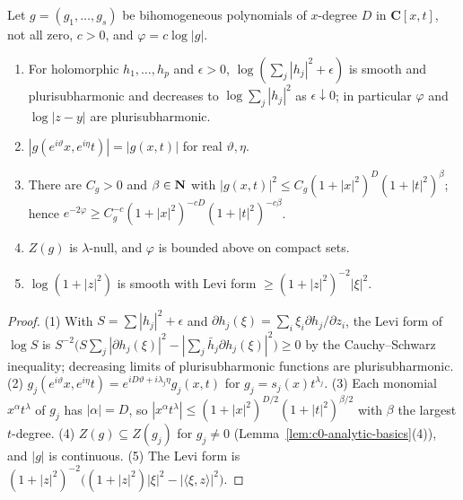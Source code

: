 \begin{lemma}\label{lem:c0-weight}
\leanok
{}
Let $g=(g_1,\dots,g_s)$ be bihomogeneous polynomials of $x$-degree $D$ in $\mathbf C[x,t]$, not all zero, $c>0$, and
$\varphi=c\log|g|$.
\begin{enumerate}
\item For holomorphic $h_1,\dots,h_p$ and $\epsilon>0$, $\log(\sum_j|h_j|^2+\epsilon)$ is smooth and plurisubharmonic and decreases to
$\log\sum_j|h_j|^2$ as $\epsilon\downarrow0$; in particular $\varphi$ and $\log|z-y|$ are plurisubharmonic.
\item $|g(e^{i\vartheta}x,e^{i\eta}t)|=|g(x,t)|$ for real $\vartheta,\eta$.
\item There are $C_g>0$ and $\beta\in\mathbf{N}$ with $|g(x,t)|^2\le C_g(1+|x|^2)^D(1+|t|^2)^\beta$; hence
$e^{-2\varphi}\ge C_g^{-c}(1+|x|^2)^{-cD}(1+|t|^2)^{-c\beta}$.
\item $Z(g)$ is $\lambda$-null, and $\varphi$ is bounded above on compact sets.
\item $\log(1+|z|^2)$ is smooth with Levi form $\ge(1+|z|^2)^{-2}|\xi|^2$.
\end{enumerate}
\end{lemma}

\begin{proof}
(1) With $S=\sum|h_j|^2+\epsilon$ and $\partial h_j(\xi)=\sum_i\xi_i\partial h_j/\partial z_i$, the Levi form of $\log S$ is
$S^{-2}\bigl(S\sum_j|\partial h_j(\xi)|^2-|\sum_j\bar h_j\partial h_j(\xi)|^2\bigr)\ge0$ by the Cauchy--Schwarz inequality; decreasing limits of
plurisubharmonic functions are plurisubharmonic. (2) $g_j(e^{i\vartheta}x,e^{i\eta}t)=e^{iD\vartheta+i\lambda_j\eta}g_j(x,t)$ for $g_j=s_j(x)t^{\lambda_j}$. (3)
Each monomial $x^\alpha t^\lambda$ of $g_j$ has $|\alpha|=D$, so $|x^\alpha t^\lambda|\le(1+|x|^2)^{D/2}(1+|t|^2)^{\beta/2}$ with $\beta$ the largest
$t$-degree. (4) $Z(g)\subseteq Z(g_j)$ for $g_j\ne0$ (Lemma~\ref{lem:c0-analytic-basics}(4)), and $|g|$ is continuous. (5) The Levi form is
$(1+|z|^2)^{-2}\bigl((1+|z|^2)|\xi|^2-|\langle\xi,z\rangle|^2\bigr)$.
\end{proof}

